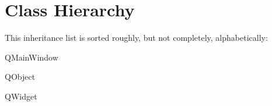 \section{Class Hierarchy}
This inheritance list is sorted roughly, but not completely, alphabetically\+:\begin{DoxyCompactList}
\item {}
\item {}
\item {}
\item Q\+Main\+Window\begin{DoxyCompactList}
\item {}
\end{DoxyCompactList}
\item Q\+Object\begin{DoxyCompactList}
\item {}
\end{DoxyCompactList}
\item Q\+Widget\begin{DoxyCompactList}
\item {}
\end{DoxyCompactList}
\item {}
\end{DoxyCompactList}
